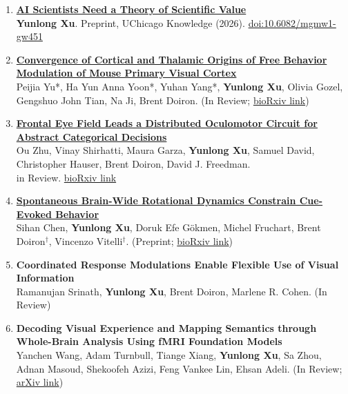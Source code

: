 \documentclass[10pt,letterpaper]{article}
\begin{document}
\begin{enumerate}

\item \textbf{\href{https://dracoxu.com/papers/scientific-value/}{AI Scientists Need a Theory of Scientific Value}}\\
\textbf{Yunlong Xu}. Preprint, UChicago Knowledge (2026). \href{https://doi.org/10.6082/mgmw1-gw451}{doi:10.6082/mgmw1-gw451}\\

\item \textbf{\href{https://doi.org/10.64898/2026.01.07.698022}{Convergence of Cortical and Thalamic Origins of Free Behavior Modulation of Mouse Primary Visual Cortex}}\\
Peijia Yu*, Ha Yun Anna Yoon*, Yuhan Yang*, \textbf{Yunlong Xu}, Olivia Gozel, Gengshuo John Tian, Na Ji, Brent Doiron. (In Review; \href{https://www.biorxiv.org/content/10.64898/2026.01.07.698022v1}{ bioRxiv link})\\

\item \textbf{\href{https://doi.org/10.64898/2026.06.30.735630}{Frontal Eye Field Leads a Distributed Oculomotor Circuit for Abstract Categorical Decisions}}\\
Ou Zhu, Vinay Shirhatti, Maura Garza, \textbf{Yunlong Xu}, Samuel David, Christopher Hauser, Brent Doiron, David J. Freedman.\\ in Review. \href{https://doi.org/10.64898/2026.06.30.735630}{ bioRxiv link}\\

\item \textbf{\href{https://doi.org/10.64898/2026.10.17.759884}{Spontaneous Brain-Wide Rotational Dynamics Constrain Cue-Evoked Behavior}}\\
Sihan Chen, \textbf{Yunlong Xu}, Doruk Efe G\"{o}kmen, Michel Fruchart, Brent Doiron$^\dagger$, Vincenzo Vitelli$^\dagger$. (Preprint; \href{https://www.biorxiv.org/content/10.64898/2026.10.17.759884v1}{bioRxiv link})\\

\item \textbf{Coordinated Response Modulations Enable Flexible Use of Visual Information}\\
Ramanujan Srinath, \textbf{Yunlong Xu}, Brent Doiron, Marlene R. Cohen. (In Review)\\

\item \textbf{
Decoding Visual Experience and Mapping Semantics through Whole-Brain Analysis Using fMRI Foundation Models}\\
Yanchen Wang, Adam Turnbull, Tiange Xiang, \textbf{Yunlong Xu}, Sa Zhou, Adnan Masoud, Shekoofeh Azizi, Feng Vankee Lin, Ehsan Adeli. (In Review; \href{https://arxiv.org/abs/2411.07121}{ arXiv link})
\\






\end{enumerate}
\end{document}
